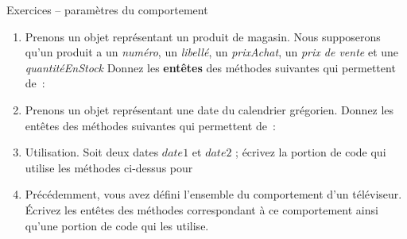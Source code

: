 		\begin{Emphase}{Exercices – paramètres du comportement}
			\remonter
			\begin{enumerate}
			\item 
				Prenons un objet représentant un produit de magasin. 
				Nous supposerons qu'un produit a un \textit{numéro}, 
				un  \textit{libellé}, un \textit{prixAchat}, 
				un \textit{prix de vente} et une \textit{quantitéEnStock}
				Donnez les \textbf{entêtes} des méthodes suivantes 
				qui permettent de~:
						
			\item 
				Prenons un objet représentant une date du calendrier grégorien. 
				Donnez les entêtes des méthodes suivantes qui permettent de~:
					
			\item 
				Utilisation. Soit deux dates $date1$ et $date2$ ; écrivez la
				portion de code qui utilise les méthodes ci-dessus pour
				
			\item 
				Précédemment, vous avez défini l'ensemble du
				comportement d'un téléviseur. Écrivez les entêtes des
				méthodes correspondant à ce comportement ainsi qu'une
				portion de code qui les utilise.
			\end{enumerate}
		\end{Emphase}
	
